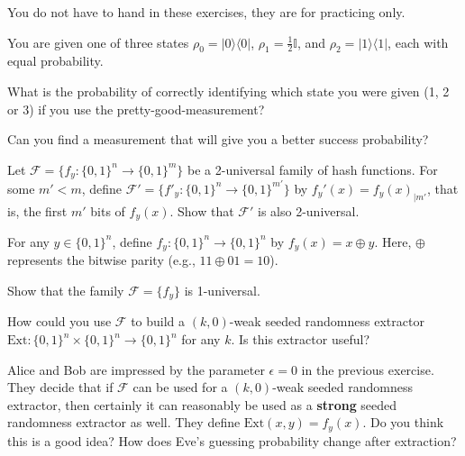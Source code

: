 \documentclass[a4paper,10pt,landscape,twocolumn]{scrartcl}
\newcommand{\ket}[1]{\lvert #1 \rangle}
\newcommand{\bra}[1]{\langle #1 \rvert}
\newcommand{\id}{\mathbb{I}}
\begin{document}
\practiceproblems

{\sffamily\noindent
You do not have to hand in these exercises, they are for practicing only. %
}

\begin{exercise}
You are given one of three states $\rho_0 = \ket0\bra0$, $\rho_1 = \frac{1}{2}\id$, and $\rho_2 = \ket1\bra1$, each with equal probability.
\begin{subex}
	What is the probability of correctly identifying which state you were given (1, 2 or 3) if you use the pretty-good-measurement?
\end{subex}
\begin{subex}
	Can you find a measurement that will give you a better success probability?
\end{subex}
\end{exercise}

\begin{exercise}[2-universality]
Let $\mathscr{F} = \{f_y : \{0,1\}^n \to \{0,1\}^m\}$ be a 2-universal family of hash functions. For some $m' < m$, define $\mathscr{F}' = \{f'_y : \{0,1\}^n \to \{0,1\}^{m'}\}$ by $f_y'(x) = f_y(x)_{|m'}$, that is, the first $m'$ bits of $f_y(x)$. Show that $\mathscr{F}'$ is also 2-universal.
\end{exercise}

\begin{exercise}
	For any $y \in \{0,1\}^n$, define $f_y : \{0,1\}^n \to \{0,1\}^n$ by $f_y(x) = x \oplus y$. Here, $\oplus$ represents the bitwise parity (e.g., $11 \oplus 01 = 10$).
	\begin{subex}
		Show that the family $\mathscr{F} = \{f_y\}$ is 1-universal.
	\end{subex}
    \begin{subex}
    	How could you use $\mathscr{F}$ to build a $(k,0)$-weak seeded randomness extractor $\text{Ext} : \{0,1\}^n \times \{0,1\}^n \to \{0,1\}^n$ for any $k$. Is this extractor useful?
    \end{subex}
    \begin{subex}
    	Alice and Bob are impressed by the parameter $\epsilon = 0$ in the previous exercise. They decide that if $\mathscr{F}$ can be used for a $(k,0)$-weak seeded randomness extractor, then certainly it can reasonably be used as a \textbf{strong} seeded randomness extractor as well. They define $\text{Ext}(x,y) = f_y(x)$. Do you think this is a good idea? How does Eve's guessing probability change after extraction?
    \end{subex}
\end{exercise}
\end{document}
